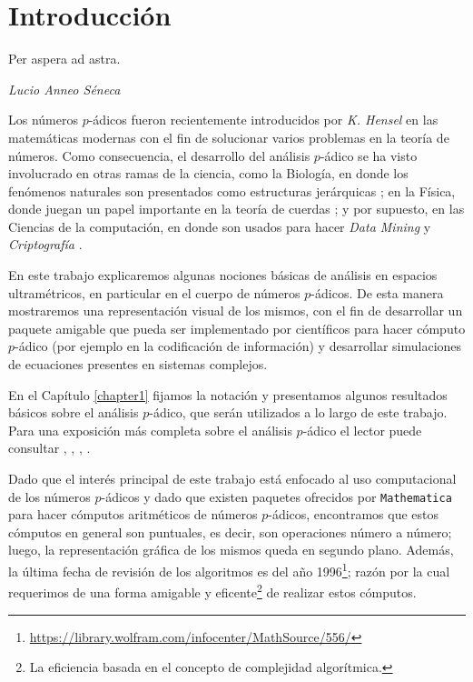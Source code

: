\chapter*{Introducción}
\epigraph{Per aspera ad astra.}{\textit{Lucio Anneo Séneca}}
Los números $p$-ádicos fueron recientemente introducidos por \textit{K. Hensel} en las matemáticas modernas con el fin de solucionar varios problemas en la teoría de números. Como consecuencia, el desarrollo del análisis $p$-ádico se ha visto involucrado en otras ramas de la ciencia, como la Biología, en donde los fenómenos naturales son presentados como estructuras jerárquicas \cite{Av-5}; en la Física, donde juegan un papel importante en la teoría de cuerdas \cite{Dragovich-2017}; y por supuesto, en las Ciencias de la computación, en donde son usados para hacer \textit{Data Mining} y \textit{Criptografía} \cite{Dragovich-2017}.

En este trabajo explicaremos algunas nociones básicas de análisis en espacios ultramétricos, en particular en el cuerpo de números $p$-ádicos. De esta manera mostraremos una representación visual de los mismos, con el fin de desarrollar un paquete amigable que pueda ser implementado por científicos para hacer cómputo $p$-ádico (por ejemplo en la codificación de información) y desarrollar simulaciones de ecuaciones presentes en sistemas complejos.

En el Capítulo \ref{chapter1} fijamos la notación y presentamos algunos resultados básicos sobre el análisis  $p$-ádico, que serán utilizados a lo largo de este trabajo. Para una exposición más completa  sobre el análisis $p$-ádico  el
lector puede consultar  \cite{A-K-S}, \cite{Taibleson}, \cite{Koch}, \cite{V-V-Z}.

Dado que el interés principal de este trabajo está enfocado al uso computacional de los números $p$-ádicos y dado que existen paquetes ofrecidos por \texttt{Mathematica} para hacer cómputos aritméticos de números $p$-ádicos, encontramos que estos cómputos en general son puntuales, es decir, son operaciones número a número; luego, la representación gráfica de los mismos queda en segundo plano. Además, la última fecha de revisión de los algoritmos es del año 1996\footnote{\url{https://library.wolfram.com/infocenter/MathSource/556/}}; razón por la cual requerimos de una forma amigable y eficente\footnote{La eficiencia basada en el concepto de complejidad algorítmica.} de realizar estos cómputos.

